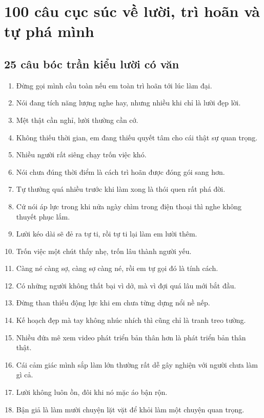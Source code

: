\chapter{100 câu cục súc về lười, trì hoãn và tự phá mình}

\section{25 câu bóc trần kiểu lười có văn}
\begin{enumerate}[leftmargin=*]
\item Đừng gọi mình cầu toàn nếu em toàn trì hoãn tới lúc làm đại.
\item Nói đang tích năng lượng nghe hay, nhưng nhiều khi chỉ là lười đẹp lời.
\item Mệt thật cần nghỉ, lười thường cần cớ.
\item Không thiếu thời gian, em đang thiếu quyết tâm cho cái thật sự quan trọng.
\item Nhiều người rất siêng chạy trốn việc khó.
\item Nói chưa đúng thời điểm là cách trì hoãn được đóng gói sang hơn.
\item Tự thưởng quá nhiều trước khi làm xong là thói quen rất phá đời.
\item Cứ nói áp lực trong khi nửa ngày chìm trong điện thoại thì nghe không thuyết phục lắm.
\item Lười kéo dài sẽ đẻ ra tự ti, rồi tự ti lại làm em lười thêm.
\item Trốn việc một chút thấy nhẹ, trốn lâu thành người yếu.
\item Càng né càng sợ, càng sợ càng né, rồi em tự gọi đó là tính cách.
\item Có những người không thất bại vì dở, mà vì đợi quá lâu mới bắt đầu.
\item Đừng than thiếu động lực khi em chưa từng dựng nổi nề nếp.
\item Kế hoạch đẹp mà tay không nhúc nhích thì cũng chỉ là tranh treo tường.
\item Nhiều đứa mê xem video phát triển bản thân hơn là phát triển bản thân thật.
\item Cái cảm giác mình sắp làm lớn thường rất dễ gây nghiện với người chưa làm gì cả.
\item Lười không luôn ồn, đôi khi nó mặc áo bận rộn.
\item Bận giả là làm mười chuyện lặt vặt để khỏi làm một chuyện quan trọng.

\end{enumerate}
